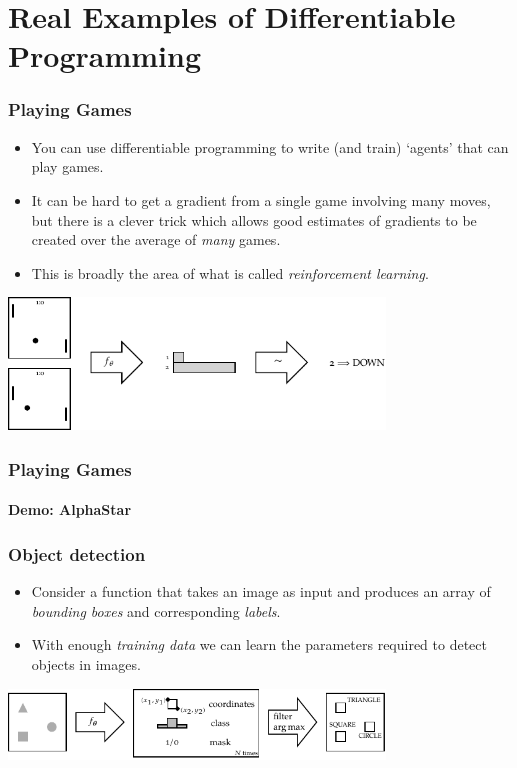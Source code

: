 \documentclass[\beamerclass]{beamer}
\begin{document}
\section{Real Examples of Differentiable Programming}

\begin{frame}
\frametitle{Playing Games}

\begin{itemize}
	\item You can use differentiable programming to write (and train) `agents' that can play games.
	\item It can be hard to get a gradient from a single game involving many moves, but there is a clever trick which allows good estimates of gradients to be created over the average of \emph{many} games.
	\item This is broadly the area of what is called \emph{reinforcement learning}.
\end{itemize}

\begin{center}
\includegraphics[width=0.75\textwidth]{pong}
\end{center}
\end{frame}

\begin{frame}
\frametitle{Playing Games}
\framesubtitle{Demo: AlphaStar}
\end{frame}

\begin{frame}
\frametitle{Object detection}

\begin{itemize}
	\item Consider a function that takes an image as input and produces an array of \emph{bounding boxes} and corresponding \emph{labels}.
	\item With enough \emph{training data} we can learn the parameters required to detect objects in images.
\end{itemize}

\begin{center}
\includegraphics[width=0.75\textwidth]{objdet-sets}
\end{center}
\end{frame}
\end{document}
